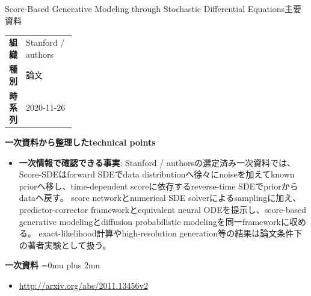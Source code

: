 \begin{technicalnote}{Score-Based Generative Modeling through Stochastic Differential Equations}{主要資料}
\begingroup
\begin{tabularx}{\linewidth}{@{}>{\bfseries}p{0.22\linewidth}X@{}}
組織 & Stanford / authors \\
種別 & 論文 \\
時系列 & 2020-11-26 \\
\end{tabularx}
\smallskip
{\bfseries 一次資料から整理したtechnical points}
\begin{minipage}{\linewidth}
\begin{itemize}[leftmargin=1.5em,itemsep=0.35em]
\item \textbf{一次情報で確認できる事実}: Stanford / authorsの選定済み一次資料では、Score-SDEはforward SDEでdata distributionへ徐々にnoiseを加えてknown priorへ移し、time-dependent scoreに依存するreverse-time SDEでpriorからdataへ戻す。 score networkとnumerical SDE solverによるsamplingに加え、predictor-corrector frameworkとequivalent neural ODEを提示し、score-based generative modelingとdiffusion probabilistic modelingを同一frameworkに収める。 exact-likelihood計算やhigh-resolution generation等の結果は論文条件下の著者実験として扱う。
\end{itemize}
\begin{minipage}{\linewidth}
\begin{samepage}
{\bfseries 一次資料}
\begingroup\sloppy
\Urlmuskip=0mu plus 2mu\relax
\begin{itemize}[leftmargin=1.5em,itemsep=0.25em]
\item {\scriptsize\url{http://arxiv.org/abs/2011.13456v2}}
\end{itemize}
\endgroup
\end{samepage}
\end{minipage}
\end{minipage}
\endgroup
\end{technicalnote}
\medskip
